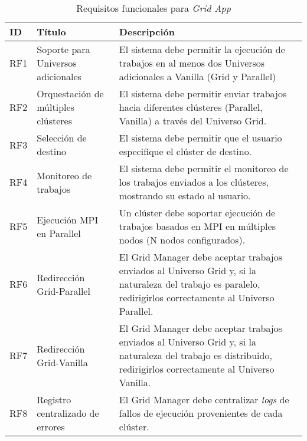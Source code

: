 \begin{table}[H]
	\centering
	\renewcommand{\arraystretch}{1.2} %
	\fontsize{9pt}{10pt}\selectfont %
	\begin{tabular}{|p{1cm}|p{4cm}|p{8cm}|} %
		\hline
		\textbf{ID}                              & \textbf{Título}                               & \textbf{Descripción} \\
        \hline
		RF1 & Soporte para Universos adicionales & El sistema debe permitir la ejecución de trabajos en al menos dos Universos adicionales a Vanilla (Grid y Parallel) \\
		RF2 & Orquestación de múltiples clústeres & El sistema debe permitir enviar trabajos hacia diferentes clústeres (Parallel, Vanilla) a través del Universo Grid. \\
		RF3 & Selección de destino & El sistema debe permitir que el usuario especifique el clúster de destino. \\
		RF4 & Monitoreo de trabajos & El sistema debe permitir el monitoreo de los trabajos enviados a los clústeres, mostrando su estado al usuario. \\
		RF5 & Ejecución MPI en Parallel & Un clúster debe soportar ejecución de trabajos basados en MPI en múltiples nodos (N nodos configurados). \\
		RF6 & Redirección Grid-Parallel & El Grid Manager debe aceptar trabajos enviados al Universo Grid y, si la naturaleza del trabajo es paralelo, redirigirlos correctamente al Universo Parallel. \\
		RF7 & Redirección Grid-Vanilla & El Grid Manager debe aceptar trabajos enviados al Universo Grid y, si la naturaleza del trabajo es distribuido, redirigirlos correctamente al Universo Vanilla. \\
		RF8 & Registro centralizado de errores & El Grid Manager debe centralizar \textit{logs} de fallos de ejecución provenientes de cada clúster. \\
        \hline
	\end{tabular}
	\caption{Requisitos funcionales para \textit{Grid App}}
	\label{table:requisitosFuncionales}
\end{table}